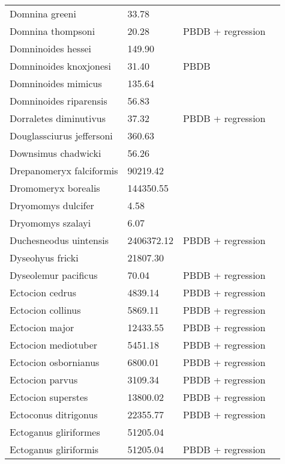 \documentclass{article}
\begin{document}
\begin{center}
\begin{longtable}{p{} p{} p{} p{}}
    Domnina greeni & 33.78 & \cite{Tomiya2013} &  \\ 
    Domnina thompsoni & 20.28 & PBDB + regression &  \\ 
    Domninoides hessei & 149.90 & \cite{Tomiya2013} &  \\ 
    Domninoides knoxjonesi & 31.40 & PBDB &  \\ 
    Domninoides mimicus & 135.64 & \cite{Tomiya2013} &  \\ 
    Domninoides riparensis & 56.83 & \cite{Tomiya2013} &  \\ 
    Dorraletes diminutivus & 37.32 & PBDB + regression &  \\ 
    Douglassciurus jeffersoni & 360.63 & \cite{Mihlbachler2006} &  \\ 
    Downsimus chadwicki & 56.26 & \cite{Tomiya2013} &  \\ 
    Drepanomeryx falciformis & 90219.42 & \cite{Tomiya2013} &  \\ 
    Dromomeryx borealis & 144350.55 & \cite{Tomiya2013} &  \\ 
    Dryomomys dulcifer & 4.58 & \cite{Novacek1977} &  \\ 
    Dryomomys szalayi & 6.07 & \cite{Novacek1977} &  \\ 
    Duchesneodus uintensis & 2406372.12 & PBDB + regression &  \\ 
    Dyseohyus fricki & 21807.30 & \cite{Tomiya2013} &  \\ 
    Dyseolemur pacificus & 70.04 & PBDB + regression &  \\ 
    Ectocion cedrus & 4839.14 & PBDB + regression &  \\ 
    Ectocion collinus & 5869.11 & PBDB + regression &  \\ 
    Ectocion major & 12433.55 & PBDB + regression &  \\ 
    Ectocion mediotuber & 5451.18 & PBDB + regression &  \\ 
    Ectocion osbornianus & 6800.01 & PBDB + regression &  \\ 
    Ectocion parvus & 3109.34 & PBDB + regression &  \\ 
    Ectocion superstes & 13800.02 & PBDB + regression &  \\ 
    Ectoconus ditrigonus & 22355.77 & PBDB + regression &  \\ 
    Ectoganus gliriformes & 51205.04 & \cite{Novacek1977} &  \\ 
    Ectoganus gliriformis & 51205.04 & PBDB + regression &  \\ 

\end{longtable}
\end{center}
\end{document}
